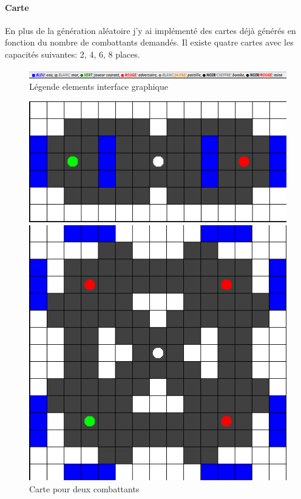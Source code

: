 \documentclass[a4paper,12pt]{article}
\begin{document}
	\paragraph{Carte}
	\label{sec:carte}
	En plus de la génération aléatoire j'y ai implémenté des cartes déjà générés en fonction du nombre de combattants demandés. Il existe quatre cartes avec les capacités suivantes: 2, 4, 6, 8 places.  
	\begin{figure}[h!]
		\centering
		\includegraphics[width=1\linewidth]{legende}
		\caption{Légende elements interface graphique}
	\end{figure}
	\begin{figure}[h!]
		\centering
		\begin{minipage}{0.5\linewidth}
			\centering
			\includegraphics[width=\linewidth]{carte_1}
			\caption{Carte pour deux combattants}
		\end{minipage}\hfill
		\begin{minipage}{0.4\linewidth}
			\centering
			\includegraphics[width=\linewidth]{carte_2}

\end{minipage}
\end{figure}
\end{document}
